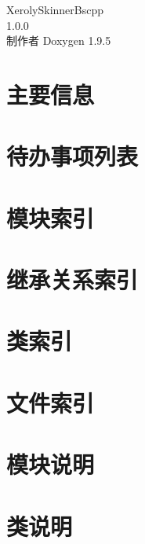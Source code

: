 \documentclass[twoside]{book}
\newcommand{\+}{\discretionary{\mbox{\scriptsize$\hookleftarrow$}}{}{}}
\newcommand{\clearemptydoublepage}{%
    \newpage{\pagestyle{empty}\cleardoublepage}%
  }
\begin{document}
  \raggedbottom
  \begin{CJK}{UTF8}{gbsn}
    \hypersetup{pageanchor=false,
                bookmarksnumbered=true,
                pdfencoding=unicode
               }
  \begin{titlepage}
  \vspace*{7cm}
  \begin{center}%
  {\Large Xeroly\+Skinner\+Bscpp}\\
  [1ex]\large 1.\+0.\+0 \\
  \vspace*{1cm}
  {\large 制作者 Doxygen 1.9.5}\\
  \end{center}
  \end{titlepage}
  \clearemptydoublepage
  \tableofcontents
  \clearemptydoublepage
  \hypersetup{pageanchor=true}
\chapter{主要信息}
\label{index}\hypertarget{index}{}
\chapter{待办事项列表}
\label{todo}

\chapter{模块索引}

\chapter{继承关系索引}

\chapter{类索引}

\chapter{文件索引}

\chapter{模块说明}

\chapter{类说明}



















\end{CJK}
\end{document}
